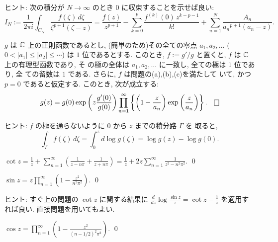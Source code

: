\documentclass[12pt,twoside]{jarticle}
\begin{document}
\noindent%
ヒント: 次の積分が $N\to\infty$ のとき $0$ に収束することを示せば良い:
\[
  I_N
  :=
  \frac{1}{2\pi i}
  \int_{C_N} \frac{f(\zeta)\,d\zeta}{\zeta^{p+1}(\zeta - z)}
  =
  \frac{f(z)}{z^{p+1}}
  - \sum_{k=0}^p \frac{f^{(k)}(0)\,z^{k-p-1}}{k!} 
  + \sum_{n=1}^N \frac{A_n}{{a_n}^{p+1}(a_n - z)}.
\]

\begin{question}[正則函数の無限乗積展開]\label{q:mugen-joseki-tenkai}
  $g$ は ${\mathbb C}$ 上の正則函数であるとし, %
  (簡単のため)その全ての零点 $a_1, a_2, \dots$ %
  ($0 < |a_1| \le |a_2| \le \cdots$) は $1$ 位であるとする. 
  このとき, $f := g'/g$ と置くと, $f$ は ${\mathbb C}$ 上の有理型函数であり, そ
  の極の全体は $a_1, a_2, \dots$ に一致し, 全ての極は $1$ 位であり, 全
  ての留数は $1$ である. %
  さらに, $f$ は問題の(a),(b),(c)を満たして
  いて, かつ $p=0$ であると仮定する. このとき, 次が成立する:
  \[
    g(z) = g(0)
           \exp\left( z \frac{g'(0)}{g(0)} \right)
           \prod_{n=1}^\infty
             \left\{
               \left( 1 - \frac{z}{a_n} \right)
               \exp\left( \frac{z}{a_n} \right)
             \right\}.
  \qed
  \]
\end{question}

\noindent
ヒント: $f$ の極を通らないように $0$ から $z$ までの積分路 $\Gamma$ を
取ると,
\[
  \int_\Gamma f(\zeta)\,d\zeta
  = \int_0^z d\log g(\zeta)
  = \log g(z) - \log g(0).
\]

\begin{question}\qstar{*}
  \(\displaystyle
    \cot z
    =
    \frac{1}{z}
    + \sum_{n=1}^\infty
    \left( \frac{1}{z - n\pi} + \frac{1}{z + n\pi} \right)
    =
    \frac{1}{z}
    + 2 z \sum_{n=1}^\infty \frac{1}{z^2 - n^2\pi^2}.
  \)
  \qed
\end{question}

\begin{question}\qstar{*}
  \(\displaystyle
    \sin z =
    z \prod_{n=1}^\infty \left( 1 - \frac{z^2}{n^2\pi^2} \right).
  \)
  \qed
\end{question}

\noindent
ヒント: すぐ上の問題の $\cot z$ に関する結果に
\(\displaystyle
  \frac{d}{dz}\log\frac{\sin z}{z} = \cot z - \frac{1}{z}
\)
を適用すれば良い. 直接問題を用いてもよい. 

\begin{question}
  \(\displaystyle
    \cos z =
    \prod_{n=1}^\infty \left( 1 - \frac{z^2}{(n-1/2)^2\pi^2} \right).
  \)
  \qed
\end{question}
\end{document}
